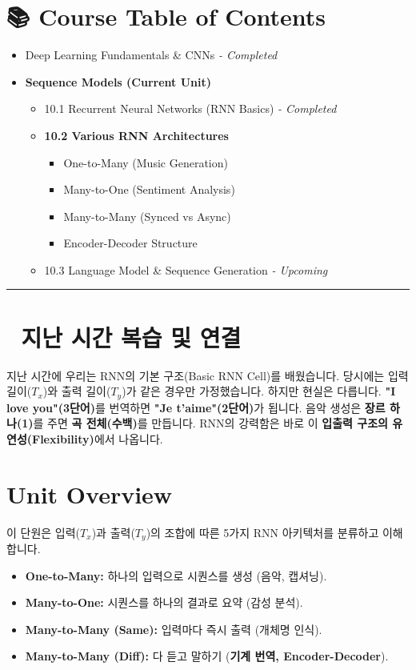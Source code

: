 \documentclass[11pt,a4paper]{book}
\theoremstyle{definition}
\begin{document}
\section*{📚 Course Table of Contents}
\begin{itemize}
    \item[Chapter 1-9.] Deep Learning Fundamentals \& CNNs \textit{- Completed}
    \item[\textbf{Chapter 10.}] \textbf{Sequence Models (Current Unit)}
    \begin{itemize}
        \item 10.1 Recurrent Neural Networks (RNN Basics) \textit{- Completed}
        \item \textbf{10.2 Various RNN Architectures}
        \begin{itemize}
            \item One-to-Many (Music Generation)
            \item Many-to-One (Sentiment Analysis)
            \item Many-to-Many (Synced vs Async)
            \item Encoder-Decoder Structure
        \end{itemize}
        \item 10.3 Language Model \& Sequence Generation \textit{- Upcoming}
    \end{itemize}
\end{itemize}

\vspace{0.5cm}
\hrule
\vspace{0.5cm}

\section*{🔗 지난 시간 복습 및 연결}
지난 시간에 우리는 RNN의 기본 구조(Basic RNN Cell)를 배웠습니다. 당시에는 입력 길이($T_x$)와 출력 길이($T_y$)가 같은 경우만 가정했습니다.
하지만 현실은 다릅니다. \textbf{"I love you"(3단어)}를 번역하면 \textbf{"Je t'aime"(2단어)}가 됩니다. 음악 생성은 \textbf{장르 하나(1)}를 주면 \textbf{곡 전체(수백)}를 만듭니다.
RNN의 강력함은 바로 이 \textbf{입출력 구조의 유연성(Flexibility)}에서 나옵니다.

\section{Unit Overview}
\begin{summarybox}[title={핵심 목표}]
이 단원은 입력($T_x$)과 출력($T_y$)의 조합에 따른 5가지 RNN 아키텍처를 분류하고 이해합니다.
\begin{itemize}
    \item \textbf{One-to-Many:} 하나의 입력으로 시퀀스를 생성 (음악, 캡셔닝).
    \item \textbf{Many-to-One:} 시퀀스를 하나의 결과로 요약 (감성 분석).
    \item \textbf{Many-to-Many (Same):} 입력마다 즉시 출력 (개체명 인식).
    \item \textbf{Many-to-Many (Diff):} 다 듣고 말하기 (\textbf{기계 번역, Encoder-Decoder}).
\end{itemize}
\end{summarybox}
\end{document}
